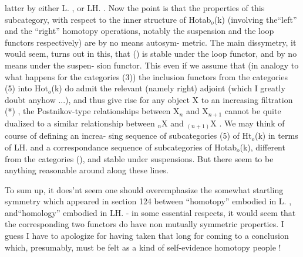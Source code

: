 
latter by either L\hand{$\pi$}. , or LH. . Now the point is that the properties
of this subcategory, with respect to the inner structure of Hotab$_o$(k)
(involving the``left'' and the ``right'' homotopy operations, notably the
suspension and the loop functors respectively) are by no means autosym-%
metric. The main dissymetry, it would seem, turns out in this, that
() is stable under the loop functor, and by no means under the suspen-%
sion functor. This  even if we assume that (in analogy
to what happens for the categories (3)) the inclusion functors from the
categories (5) into Hot$_o$(k) do admit the relevant (namely right) adjoint
(which I greatly doubt anyhow ...), and thus give rise for any object X
to an increasing filtration (*) , the Postnikov-type relationships
between X$_n$ and X$_{n+1}$ cannot be quite dualized to a similar relationship
between $_n$X and $_{(n+1)}$X . We may think  of course\hand{,} of defining an increa-%
sing sequence of subcategories  (5) of Ht$_o$(k) in terms of LH. and a
correspondance sequence of subcategories of Hotab$_o$(k), different from
the categories (), and stable under suspensions. 
 But there  seem to be anything reasonable 
around along these lines.

To sum up, it does'nt seem one should overemphasize the somewhat
startling symmetry which appeared in section 124 between ``homotopy''
 embodied in L\hand{$\pi$}. , and``homology'' embodied in LH. -
in some essential respects, it would seem that the corresponding two
functors do have non mutually symmetric properties. I guess I have to
apologize for having taken that long for coming to a conclusion which,
presumably, must be felt as a kind of self-evidence   homotopy
people ! 

